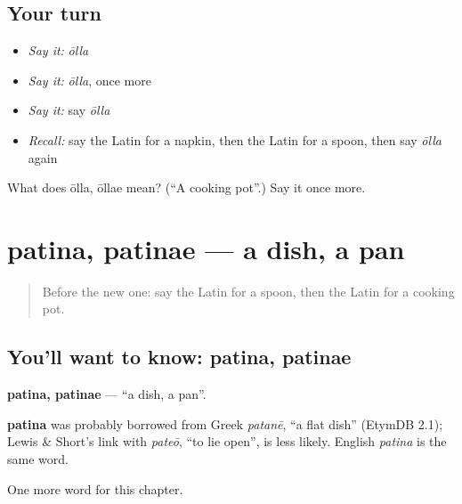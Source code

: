 \subsection*{Your turn}
\begin{itemize}
\raggedright
  \item \emph{Say it:} \emph{ōlla}
  \item \emph{Say it:} \emph{ōlla}, once more
  \item \emph{Say it:} say \emph{ōlla}
  \item \emph{Recall:} say the Latin for a napkin, then the Latin for a spoon, then say \emph{ōlla} again
\end{itemize}

\begin{tcolorbox}[breakable,colback=teal!4,colframe=teal!35!black,title={Before you move on}]
What does ōlla, ōllae mean? (\textquotedblleft{}A cooking pot\textquotedblright{}.) Say it once more.
\end{tcolorbox}
\section[patina, patinae]{patina, patinae — a dish, a pan}

\label{lesson:LA-C121-patina}



\begin{quote}
Before the new one: say the Latin for a spoon, then the Latin for a cooking pot.
\end{quote}

\subsection*{You'll want to know: patina, patinae}
\textbf{patina, patinae} — \textquotedblleft{}a dish, a pan\textquotedblright{}.

\begin{cousinweb}
\textbf{patina} was probably borrowed from Greek \emph{patanē}, \textquotedblleft{}a flat dish\textquotedblright{} (EtymDB 2.1); Lewis \& Short's link with \emph{pateō}, \textquotedblleft{}to lie open\textquotedblright{}, is less likely. English \emph{patina} is the same word.
\end{cousinweb}

\begin{grammarlens}[title={What you've built}]
One more word for this chapter.
\end{grammarlens}

